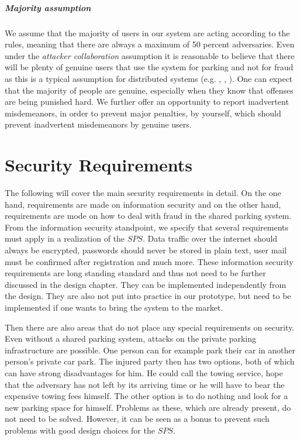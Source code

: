 \subparagraph{Majority assumption} We assume that the majority of users in our system are acting according to the rules, meaning that there are always a maximum of 50 percent adversaries. Even under the \textit{attacker collaboration} assumption it is reasonable to believe that there will be plenty of genuine users that use the system for parking and not for fraud as this is a typical assumption for distributed systems (e.g. \cite{benenson2004secure}, \cite{nojoumian2014efficient}, \cite{avoine2005gracefully}). One can expect that the majority of people are genuine, especially when they know that offenses are being punished hard. We further offer an opportunity to report inadvertent misdemeanors, in order to prevent major penalties, by yourself, which should prevent inadvertent misdemeanors by genuine users.\\

\section{Security Requirements}\label{Security Requirements}
The following will cover the main security requirements in detail. On the one hand, requirements are made on information security and on the other hand, requirements are mode on how to deal with fraud in the shared parking system. From the information security standpoint, we specify that several requirements must apply in a realization of the $SPS$. Data traffic over the internet should always be encrypted, passwords should never be stored in plain text, user mail must be confirmed after registration and much more. These information security requirements are long standing standard and thus not need to be further discussed in the design chapter. They can be implemented independently from the design. They are also not put into practice in our prototype, but need to be implemented if one wants to bring the system to the market.

Then there are also areas that do not place any special requirements on security. Even without a shared parking system, attacks on the private parking infrastructure are possible. One person can for example park their car in another person's private car park. The injured party then has two options, both of which can have strong disadvantages for him. He could call the towing service, hope that the adversary has not left by its arriving time or he will have to bear the expensive towing fees himself. The other option is to do nothing and look for a new parking space for himself. Problems as these, which are already present, do not need to be solved. However, it can be seen as a bonus to prevent such problems with good design choices for the $SPS$.\\

